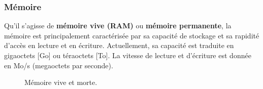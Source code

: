 \subsubsection{Mémoire}
Qu'il s'agisse de {\bf mémoire vive (RAM)} ou {\bf mémoire permanente}, la mémoire est principalement caractérisée par sa capacité de stockage et sa rapidité d'accès en lecture et en écriture. Actuellement, sa capacité est traduite en gigaoctets [Go] ou téraoctets [To]. La vitesse de lecture et d'écriture est donnée en Mo/s (megaoctets par seconde).
\begin{figure}[h!]
	\centering
	\hspace{1cm}
	\caption{Mémoire vive et morte.}
	\label{img_coul}
\end{figure}

